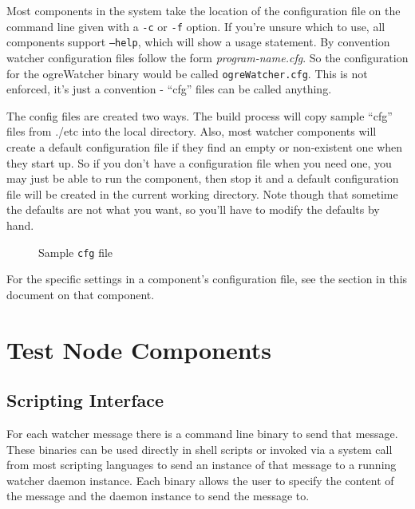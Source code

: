 \documentclass{article}
\begin{document}
Most components in the system take the location of the configuration file on the command line given with a {\tt -c} or {\tt -f} option. If you're unsure
which to use, all components support {\tt --help}, which will show a usage statement. By convention watcher configuration files follow the form {\it program-name.cfg}. 
So the configuration for the ogreWatcher binary would be called {\tt ogreWatcher.cfg}. This is not enforced, it's just a convention - ``cfg'' files can be called anything. 


The config files are created two ways. The build process will copy sample ``cfg'' files from .\slash etc into the local directory. Also, most watcher components will create a default configuration file
if they find an empty or non-existent one when they start up. So if you don't have a configuration file when you need one, you may just be able to run the component, then stop it and 
a default configuration file will be created in the current working directory.  Note though that sometime the defaults are not what you want, so you'll have to modify the defaults by hand.

\begin{figure}[htb]
\caption{Sample {\tt cfg} file}
\label{fig:watcherdCfg}
\end{figure}

For the specific settings in a component's configuration file, see the section in this document on that component. 

\section{Test Node Components}

\subsection{Scripting Interface}
For each watcher message there is a command line binary to send that message. These binaries can be used directly in shell scripts or invoked via a system call from most scripting languages to send 
an instance of that message to a running watcher daemon instance. Each binary allows the user to specify the content of the message and the daemon instance to send the message to. 
\end{document}
